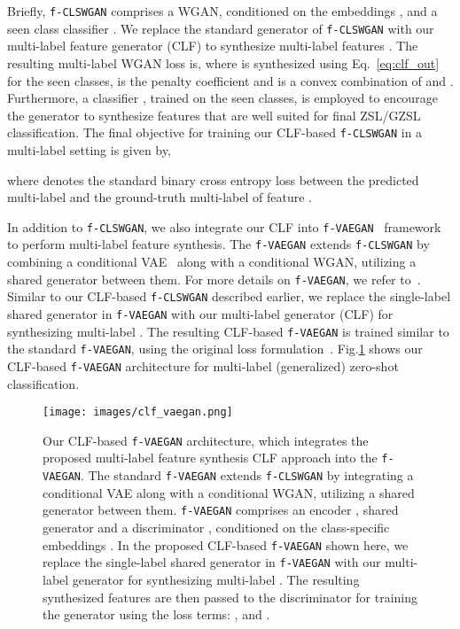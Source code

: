 \documentclass[10pt,journal,compsoc]{IEEEtran}
\newcommand{\clswgan}{\texttt{f-CLSWGAN}}
\newcommand{\vaegan}{\texttt{f-VAEGAN}}
\begin{document}
Briefly, \clswgan{} comprises a WGAN, conditioned on the embeddings , and a seen class classifier . We replace the standard generator of \clswgan{} with our multi-label feature generator (CLF) to synthesize multi-label features . The resulting multi-label WGAN loss is, 
where  is synthesized using Eq.~\ref{eq:clf_out} for the seen classes,
 is the penalty coefficient and  is a convex combination of  and . Furthermore, a classifier , trained on the seen classes, is employed to encourage the generator to synthesize features that are well suited for final ZSL/GZSL classification. The final objective for training our CLF-based \clswgan{} in a multi-label setting is given by,

where  denotes the standard binary cross entropy loss between the predicted multi-label  and the ground-truth multi-label  of feature .




In addition to \clswgan{}, we also integrate our CLF into \vaegan{}~\cite{xian2019f} framework to perform multi-label feature synthesis. The \vaegan{} extends \clswgan{} by combining a conditional VAE~\cite{kingma13iclr} along with a conditional WGAN, utilizing a shared generator between them. For more details on \vaegan{}, we refer to~\cite{xian2019f}. Similar to our CLF-based \clswgan{} described earlier, we replace the single-label shared generator in \vaegan{} with our multi-label generator (CLF) for synthesizing multi-label . The resulting CLF-based \vaegan{} is trained similar to the standard \vaegan{}, using the original loss formulation~\cite{xian2019f}. Fig.\ref{fig:overall_arch_vaegan} shows our CLF-based \vaegan{} architecture for multi-label (generalized) zero-shot classification. 


\begin{figure}
    \centering
    \texttt{[image: images/clf\_vaegan.png]}
    \caption{Our CLF-based \vaegan{} architecture, which integrates the proposed multi-label feature synthesis CLF approach into the \vaegan{}. The standard \vaegan{} extends \clswgan{} by integrating a conditional VAE along with a conditional WGAN, utilizing a shared generator between them. \vaegan{} comprises an encoder , shared generator and a discriminator , conditioned on the class-specific embeddings . In the proposed CLF-based \vaegan{} shown here, we replace the single-label shared generator in \vaegan{} with our multi-label generator  for synthesizing multi-label . The resulting synthesized features  are then passed to the discriminator for training the generator using the loss terms: ,  and .\vspace{-0.3cm}}
    \label{fig:overall_arch_vaegan}
\end{figure}
\end{document}
